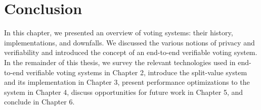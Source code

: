 \section{Conclusion}

In this chapter, we presented an overview of voting systems: their history, implementations, and downfalls. We discussed the various notions of privacy and verifiability and introduced the concept of an end-to-end verifiable voting system. In the remainder of this thesis, we survey the relevant technologies used in end-to-end verifiable voting systems in Chapter 2, introduce the split-value system and its implementation in Chapter 3, present performance optimizations to the system in Chapter 4, discuss opportunities for future work in Chapter 5, and conclude in Chapter 6.
